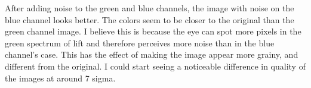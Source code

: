 After adding noise to the green and blue channels, the image with noise on the blue channel looks better. The colors seem to be closer to the original than the green channel image. I believe this is because the eye can spot more pixels in the green spectrum of lift and therefore perceives more noise than in the blue channel's case. This has the effect of making the image appear more grainy, and different from the original. I could start seeing a noticeable difference in quality of the images at around 7 sigma.